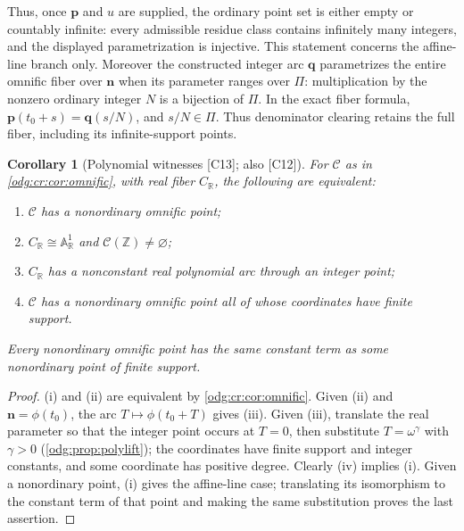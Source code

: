 \documentclass[11pt,oneside]{article}
\numberwithin{equation}{section}
\newtheorem{corollary}[corollary]{Corollary}
\theoremstyle{definition}
\theoremstyle{remark}
\newcommand{\Z}{\mathbb Z}
\newcommand{\R}{\mathbb R}
\newcommand{\src}[1]{\textup{\textsf{\small[#1]}}}
\newcommand{\Aff}{\mathbb A}
\begin{document}
Thus, once $\mathbf p$ and $u$ are supplied, the ordinary point set is either
empty or countably infinite: every admissible residue class contains infinitely
many integers, and the displayed parametrization is injective. This statement
concerns the affine-line branch only. Moreover the constructed integer arc
$\mathbf q$ parametrizes the entire omnific fiber over $\mathbf n$ when its
parameter ranges over $\Pi$: multiplication by the nonzero ordinary integer
$N$ is a bijection of $\Pi$. In the exact fiber formula,
$\mathbf p(t_0+s)=\mathbf q(s/N)$, and $s/N\in\Pi$. Thus denominator clearing
retains the full fiber, including its infinite-support points.

\begin{corollary}[Polynomial witnesses \src{C13}; also \src{C12}]\label{odg:cr:cor:polywitness}
For $\mathcal C$ as in \cref{odg:cr:cor:omnific}, with real fiber $C_\R$, the
following are equivalent:
\begin{enumerate}[label=\textup{(\roman*)},leftmargin=*]
\item $\mathcal C$ has a nonordinary omnific point;
\item $C_\R\cong\Aff^1_\R$ and $\mathcal C(\Z)\ne\varnothing$;
\item $C_\R$ has a nonconstant real polynomial arc through an integer point;
\item $\mathcal C$ has a nonordinary omnific point all of whose coordinates have
finite support.
\end{enumerate}
Every nonordinary omnific point has the same constant term as some nonordinary
point of finite support.
\end{corollary}
\begin{proof}
(i) and (ii) are equivalent by \cref{odg:cr:cor:omnific}. Given (ii) and
$\mathbf n=\phi(t_0)$, the arc $T\mapsto\phi(t_0+T)$ gives (iii). Given (iii),
translate the real parameter so that the integer point occurs at $T=0$, then
substitute $T=\omega^\gamma$ with $\gamma>0$ (\cref{odg:prop:polylift}); the
coordinates have finite support and integer constants, and some coordinate has
positive degree. Clearly (iv) implies (i). Given a nonordinary point, (i) gives
the affine-line case; translating its isomorphism to the constant term of that
point and making the same substitution proves the last assertion.
\end{proof}
\end{document}
